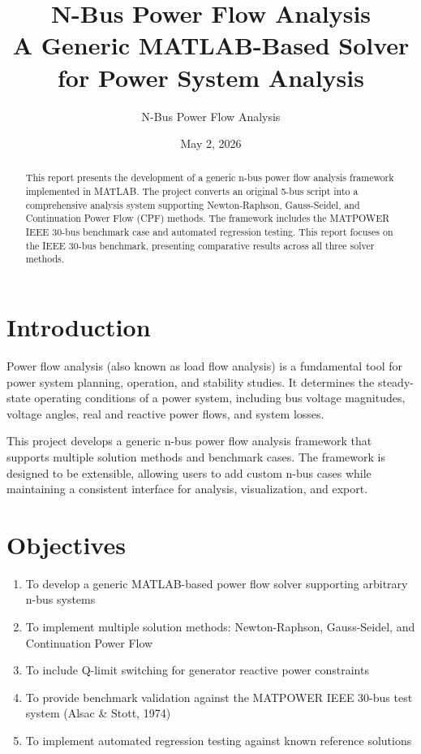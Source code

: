 \documentclass[12pt,a4paper]{article}
\title{\textbf{N-Bus Power Flow Analysis}\\
\large A Generic MATLAB-Based Solver for Power System Analysis}
\author{N-Bus Power Flow Analysis}
\date{May 2, 2026}
\begin{document}
\maketitle
\thispagestyle{empty}

\begin{abstract}
This report presents the development of a generic n-bus power flow analysis framework implemented in MATLAB. The project converts an original 5-bus script into a comprehensive analysis system supporting Newton-Raphson, Gauss-Seidel, and Continuation Power Flow (CPF) methods. The framework includes the MATPOWER IEEE 30-bus benchmark case and automated regression testing. This report focuses on the IEEE 30-bus benchmark, presenting comparative results across all three solver methods.
\end{abstract}

\section{Introduction}

Power flow analysis (also known as load flow analysis) is a fundamental tool for power system planning, operation, and stability studies. It determines the steady-state operating conditions of a power system, including bus voltage magnitudes, voltage angles, real and reactive power flows, and system losses.

This project develops a generic n-bus power flow analysis framework that supports multiple solution methods and benchmark cases. The framework is designed to be extensible, allowing users to add custom n-bus cases while maintaining a consistent interface for analysis, visualization, and export.

\section{Objectives}

\begin{enumerate}
    \item To develop a generic MATLAB-based power flow solver supporting arbitrary n-bus systems
    \item To implement multiple solution methods: Newton-Raphson, Gauss-Seidel, and Continuation Power Flow
    \item To include Q-limit switching for generator reactive power constraints
    \item To provide benchmark validation against the MATPOWER IEEE 30-bus test system (Alsac \& Stott, 1974)
    \item To implement automated regression testing against known reference solutions
\end{enumerate}
\end{document}
